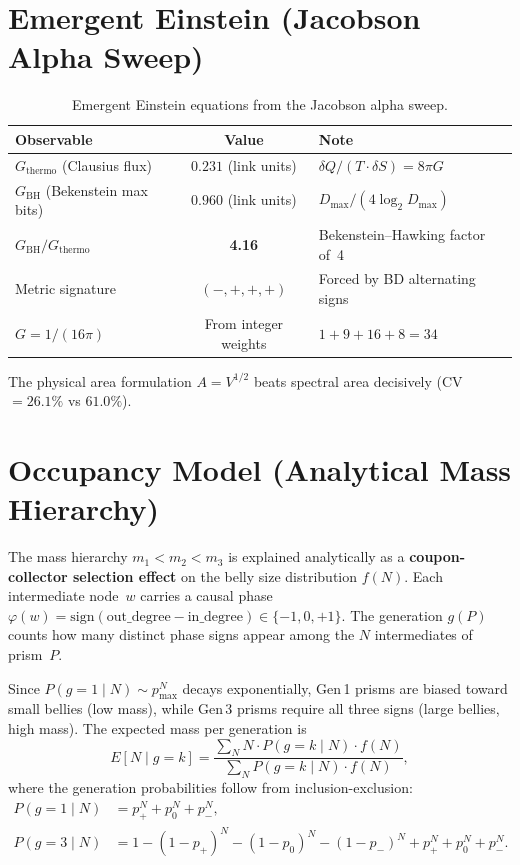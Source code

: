 \documentclass[11pt, a4paper, openany]{book}
\begin{document}
\section{Emergent Einstein (Jacobson Alpha Sweep)}

\begin{table}[H]
\centering
\begin{tabular}{@{} l c l @{}}
\toprule
\textbf{Observable} & \textbf{Value} & \textbf{Note} \\
\midrule
$G_\text{thermo}$ (Clausius flux)    & $0.231$ (link units) & $\delta Q / (T \cdot \delta S) = 8\pi G$ \\
$G_\text{BH}$ (Bekenstein max bits)  & $0.960$ (link units) & $D_\text{max} / (4 \log_2 D_\text{max})$ \\
$G_\text{BH} / G_\text{thermo}$     & \textbf{4.16}        & Bekenstein--Hawking factor of~4 \\
Metric signature                     & $(-,+,+,+)$          & Forced by BD alternating signs \\
$G = 1/(16\pi)$                      & From integer weights  & $1 + 9 + 16 + 8 = 34$ \\
\bottomrule
\end{tabular}
\caption{Emergent Einstein equations from the Jacobson alpha sweep.}
\end{table}

The physical area formulation $A = V^{1/2}$ beats spectral area decisively
(CV $= 26.1\%$ vs $61.0\%$).

\section{Occupancy Model (Analytical Mass Hierarchy)}
\label{sec:occupancy}

The mass hierarchy $m_1 < m_2 < m_3$ is explained analytically as a
\textbf{coupon-collector selection effect} on the belly size distribution
$f(N)$.  Each intermediate node~$w$ carries a causal phase
$\varphi(w) = \mathrm{sign}(\text{out\_degree} - \text{in\_degree}) \in
\{-1, 0, +1\}$.  The generation $g(P)$ counts how many distinct phase
signs appear among the $N$ intermediates of prism~$P$.

Since $P(g{=}1 \mid N) \sim p_{\max}^N$ decays exponentially, Gen\,1
prisms are biased toward small bellies (low mass), while Gen\,3 prisms
require all three signs (large bellies, high mass).  The expected mass
per generation is
\[
  E[N \mid g{=}k] = \frac{\sum_N N \cdot P(g{=}k \mid N) \cdot f(N)}%
                         {\sum_N P(g{=}k \mid N) \cdot f(N)},
\]
where the generation probabilities follow from inclusion-exclusion:
\begin{align*}
  P(g{=}1 \mid N) &= p_+^N + p_0^N + p_-^N, \\
  P(g{=}3 \mid N) &= 1 - (1{-}p_+)^N - (1{-}p_0)^N - (1{-}p_-)^N
                      + p_+^N + p_0^N + p_-^N.
\end{align*}
\end{document}
